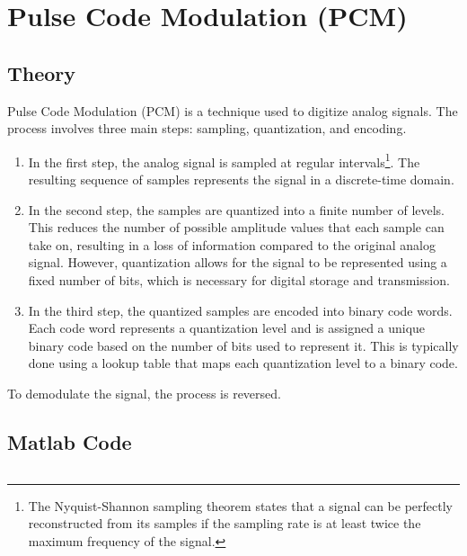 \pagebreak

\section{Pulse Code Modulation (PCM)}
\label{sec:Pulse Code Modulation (PCM)}

\subsection{Theory}

Pulse Code Modulation (PCM) is a technique used to digitize analog signals.
The process involves three main steps: sampling, quantization, and encoding.


\begin{enumerate}
      \item In the first step, the analog signal is sampled at regular intervals\footnote[1]{The Nyquist-Shannon sampling theorem states that a signal can be perfectly reconstructed from its samples if the sampling rate is at least twice the maximum frequency of the signal.}.
            The resulting sequence of samples represents the signal in a discrete-time domain.

      \item In the second step, the samples are quantized into a finite number of levels.
            This reduces the number of possible amplitude values that each sample can take on, resulting in a loss of information compared to the original analog signal.
            However, quantization allows for the signal to be represented using a fixed number of bits, which is necessary for digital storage and transmission.

      \item In the third step, the quantized samples are encoded into binary code words.
            Each code word represents a quantization level and is assigned a unique binary code based on the number of bits used to represent it.
            This is typically done using a lookup table that maps each quantization level to a binary code.
\end{enumerate}

To demodulate the signal, the process is reversed.

\subsection{Matlab Code}

\inputminted[fontsize=\footnotesize,autogobble]{matlab}{code/pcm.m}

